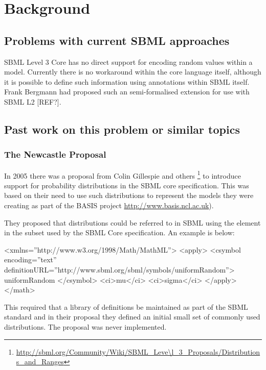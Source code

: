 \documentclass[draftspec]{sbmlpkgspec}
\begin{document}
\section{Background}

\subsection{Problems with current SBML approaches}

SBML Level 3 Core has no direct support for encoding random values
within a model. Currently there is no workaround within the core
language itself, although it is possible to define such information
using annotations within SBML itself. Frank Bergmann had proposed such
an semi-formalised extension for use with SBML L2 [REF?].

\subsection{Past work on this problem or similar topics}

\subsubsection{The Newcastle Proposal}
\label{sec:newcastle proposal}

In 2005 there was a proposal from Colin Gillespie and others
\footnote{\url{http://sbml.org/Community/Wiki/SBML\_Leve\l_3\_Proposals/Distributions\_and\_Ranges}}
to introduce support for probability distributions in the SBML core specification. This
was based on their need to use such distributions to represent the
models they were creating as part of the BASIS project
\url{http://www.basis.ncl.ac.uk}).

They proposed that distributions could be referred to in SBML using
the  element in the \mathml subset used by
the SBML Core specification. An example is below:

\begin{example}
<xmlns=''http://www.w3.org/1998/Math/MathML''>
  <apply>
    <csymbol encoding=''text''
        definitionURL=''http://www.sbml.org/sbml/symbols/uniformRandom''>
      uniformRandom
    </csymbol>
    <ci>mu</ci>
    <ci>sigma</ci>
  </apply>
</math>
\end{example}

This required that a library of definitions be maintained as part of
the SBML standard and in their proposal they defined an initial small
set of commonly used distributions. The proposal was never
implemented.
\end{document}
